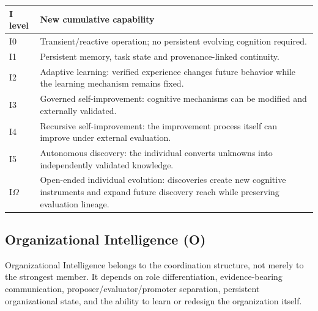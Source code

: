 \documentclass[11pt]{article}
\theoremstyle{definition}
\newcommand{\Om}{\ensuremath{\Omega}}
\begin{document}
\begin{table}[h]
\centering\small
\begin{tabularx}{\textwidth}{@{}lY@{}}
\toprule
I level & New cumulative capability \\
\midrule
I0 & Transient/reactive operation; no persistent evolving cognition required. \\
I1 & Persistent memory, task state and provenance-linked continuity. \\
I2 & Adaptive learning: verified experience changes future behavior while the learning mechanism remains fixed. \\
I3 & Governed self-improvement: cognitive mechanisms can be modified and externally validated. \\
I4 & Recursive self-improvement: the improvement process itself can improve under external evaluation. \\
I5 & Autonomous discovery: the individual converts unknowns into independently validated knowledge. \\
I\Om{} & Open-ended individual evolution: discoveries create new cognitive instruments and expand future discovery reach while preserving evaluation lineage. \\
\bottomrule
\end{tabularx}
\end{table}

\subsection{Organizational Intelligence (O)}

Organizational Intelligence belongs to the coordination structure, not merely to the strongest member. It depends on role differentiation, evidence-bearing communication, proposer/evaluator/promoter separation, persistent organizational state, and the ability to learn or redesign the organization itself.
\end{document}
